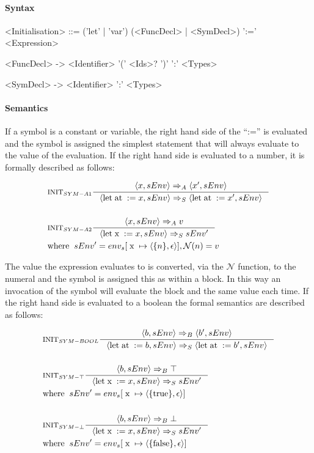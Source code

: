 \paragraph{Syntax}

\begin{grammar}
<Initialisation> ::= ('let' | 'var') (<FuncDecl> | <SymDecl>) ':=' <Expression>

<FuncDecl> -> <Identifier> '(' <Ids>? ')' ':' <Types>

<SymDecl> -> <Identifier> ':' <Types>
\end{grammar}

\paragraph{Semantics}

If a symbol is a constant or variable, the right hand side of the \enquote{:=} is evaluated and the symbol is assigned the simplest statement that will always evaluate to the value of the evaluation. If the right hand side is evaluated to a number, it is formally described as follows:

\begin{align*}
&\inference[$\text{INIT}_{SYM-A1}$]{\Braket{x,sEnv} \Rightarrow_A \Braket{x',sEnv}}
                         {\Braket{\Tlet \Tat := x,sEnv} \Rightarrow_S \Braket{\Tlet \Tat := x',sEnv}}
\\\\
&\inference[$\text{INIT}_{SYM-A2}$]{\Braket{x,sEnv} \Rightarrow_A v}
                         {\Braket{\Tlet \Tx := x,sEnv} \Rightarrow_S sEnv'}
\\
&{\Twhere sEnv' = env_{s}[\Tx \mapsto \Braket{\{n\},\epsilon}], \mathcal{N}(n) = v}
\end{align*}

The value the expression evaluates to is converted, via the $\mathcal{N}$ function, to the numeral and the symbol is assigned this as within a block. In this way an invocation of the symbol will evaluate the block and the same value each time. If the right hand side is evaluated to a boolean the formal semantics are described as follows:

\begin{align*}
&\inference[$\text{INIT}_{SYM-BOOL}$]{\Braket{b,sEnv} \Rightarrow_B \Braket{b',sEnv}}
                         {\Braket{\Tlet \Tat := b,sEnv} \Rightarrow_S \Braket{\Tlet \Tat := b',sEnv}}
\\\\
&\inference[$\text{INIT}_{SYM-\top}$]{\Braket{b,sEnv} \Rightarrow_B \top}
                         {\Braket{\Tlet \Tx := x,sEnv} \Rightarrow_S sEnv'}
\\
&{\Twhere sEnv' = env_{s}[\Tx \mapsto \Braket{\{\Ttrue\},\epsilon}]}
\\\\
&\inference[$\text{INIT}_{SYM-\bot}$]{\Braket{b,sEnv} \Rightarrow_B \bot}
                         {\Braket{\Tlet \Tx := x,sEnv} \Rightarrow_S sEnv'}
\\
&{\Twhere sEnv' = env_{s}[\Tx \mapsto \Braket{\{\Tfalse\},\epsilon}]}
\end{align*}

